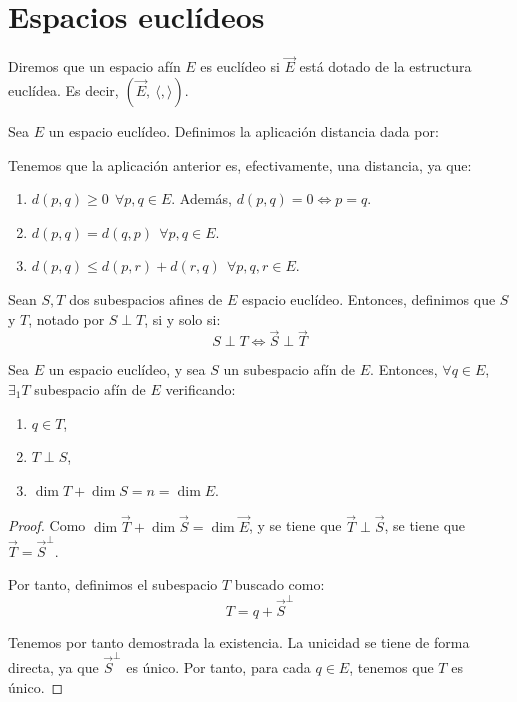 \chapter{Espacios euclídeos}

\begin{definicion}
    Diremos que un espacio afín $E$ es euclídeo si $\vec{E}$ está dotado de la estructura euclídea. Es decir, $(\vec{E},~\langle,\rangle)$.
\end{definicion}


\begin{definicion}[Distancia]
    Sea $E$ un espacio euclídeo. Definimos la aplicación distancia dada por:
\end{definicion}

Tenemos que la aplicación anterior es, efectivamente, una distancia, ya que:
\begin{enumerate}
    \item $d(p,q)\geq 0~~\forall p,q\in E$. Además, $d(p,q)=0\Longleftrightarrow p=q$.
    \item $d(p,q)=d(q,p)~~\forall p,q\in E$.
    \item $d(p,q)\leq d(p,r) + d(r,q)~~\forall p,q,r\in E$.
\end{enumerate}

\begin{definicion}
    Sean $S,T$ dos subespacios afines de $E$ espacio euclídeo. Entonces, definimos que $S$ y $T$, notado por $S\perp T$, si y solo si:
    \begin{equation*}
        S\perp T \Longleftrightarrow \vec{S}\perp \vec{T}
    \end{equation*}
\end{definicion}

\begin{teo}
    Sea $E$ un espacio euclídeo, y sea $S$ un subespacio afín de $E$. Entonces, $\forall q\in E$, $\exists_1 T$ subespacio afín de $E$ verificando:
    \begin{enumerate}
        \item $q\in T$,
        \item $T\perp S$,
        \item $\dim T + \dim S = n=\dim E$.
    \end{enumerate}
\end{teo}
\begin{proof}
    Como $\dim \vec{T} + \dim \vec{S} = \dim \vec{E}$, y se tiene que $\vec{T}\perp \vec{S}$, se tiene que $\vec{T}=\vec{S}^\perp$.
    
    Por tanto, definimos el subespacio $T$ buscado como:
    $$T=q+\vec{S}^\perp$$

    Tenemos por tanto demostrada la existencia. La unicidad se tiene de forma directa, ya que $\vec{S}^\perp$ es único. Por tanto, para cada $q\in E$, tenemos que $T$ es único.
\end{proof}

